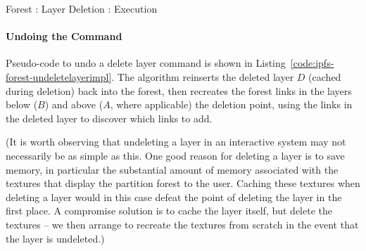
\begin{stulisting}[p]
\caption{Forest : Layer Deletion : Execution}
\label{code:ipfs-forest-deletelayerimpl}

\end{stulisting}

\paragraph{Undoing the Command}

Pseudo-code to undo a delete layer command is shown in Listing~\ref{code:ipfs-forest-undeletelayerimpl}. The algorithm reinserts the deleted layer $D$ (cached during deletion) back into the forest, then recreates the forest links in the layers below ($B$) and above ($A$, where applicable) the deletion point, using the links in the deleted layer to discover which links to add.

(It is worth observing that undeleting a layer in an interactive system may not necessarily be as simple as this. One good reason for deleting a layer is to save memory, in particular the substantial amount of memory associated with the textures that display the partition forest to the user. Caching these textures when deleting a layer would in this case defeat the point of deleting the layer in the first place. A compromise solution is to cache the layer itself, but delete the textures -- we then arrange to recreate the textures from scratch in the event that the layer is undeleted.)

